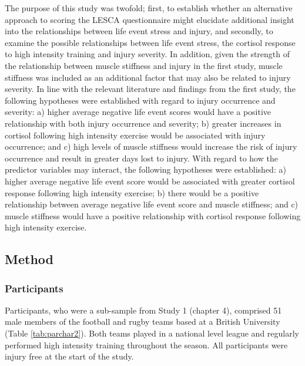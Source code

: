 \documentclass[
  english,
  man,floatsintext]{apa6}
\begin{document}
The purpose of this study was twofold; first, to establish whether an alternative approach to scoring the LESCA questionnaire might elucidate additional insight into the relationships between life event stress and injury, and secondly, to examine the possible relationships between life event stress, the cortisol response to high intensity training and injury severity.
In addition, given the strength of the relationship between muscle stiffness and injury in the first study, muscle stiffness was included as an additional factor that may also be related to injury severity.
In line with the relevant literature and findings from the first study, the following hypotheses were established with regard to injury occurrence and severity:
a) higher average negative life event scores would have a positive relationship with both injury occurrence and severity;
b) greater increases in cortisol following high intensity exercise would be associated with injury occurrence; and
c) high levels of muscle stiffness would increase the risk of injury occurrence and result in greater days lost to injury.
With regard to how the predictor variables may interact, the following hypotheses were established:
a) higher average negative life event score would be associated with greater cortisol response following high intensity exercise;
b) there would be a positive relationship between average negative life event score and muscle stiffness; and
c) muscle stiffness would have a positive relationship with cortisol response following high intensity exercise.

\hypertarget{method-1}{%
\subsection{Method}\label{method-1}}

\hypertarget{participants-2}{%
\subsubsection{Participants}\label{participants-2}}

Participants, who were a sub-sample from Study 1 (chapter 4), comprised 51 male members of the football and rugby teams based at a British University (Table \ref{tab:parchar2}). Both teams played in a national level league and regularly performed high intensity training throughout the season.
All participants were injury free at the start of the study.
\end{document}
